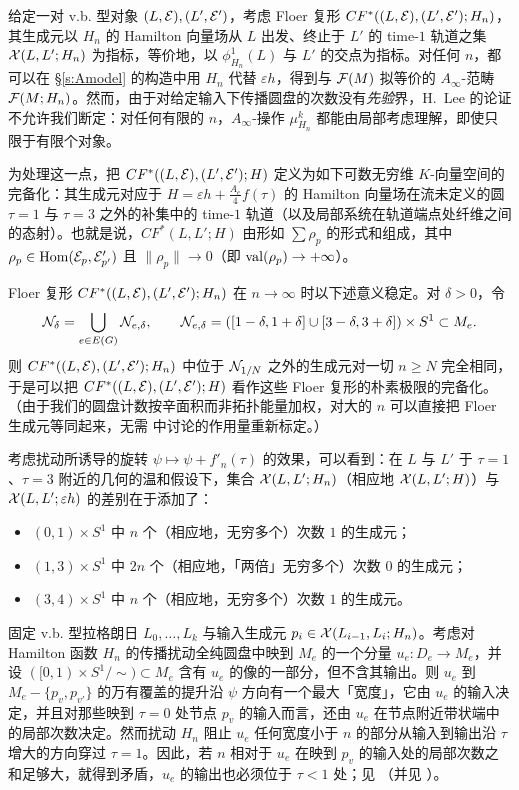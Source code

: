给定一对 v.b. 型对象 $(L,\mathcal{E}),(L',\mathcal{E}')$，考虑 Floer 复形 $CF^*((L,\mathcal{E}),(L',\mathcal{E}');H_n)$，其生成元以 $H_n$ 的 Hamilton 向量场从 $L$ 出发、终止于 $L'$ 的 time-$1$ 轨道之集 $\mathcal{X}(L,L';H_n)$ 为指标，等价地，以 $\phi^1_{H_n}(L)$ 与 $L'$ 的交点为指标。对任何 $n$，都可以在 §\ref{s:Amodel} 的构造中用 $H_n$ 代替 $\varepsilon h$，得到与 $\mathcal{F}(M)$ 拟等价的 $A_\infty$-范畴 $\mathcal{F}(M;H_n)$。然而，由于对给定输入下传播圆盘的次数没有\emph{先验}界，H.~Lee 的论证 \cite{Lee} 不允许我们断定：对任何有限的 $n$，$A_\infty$-操作 $\mu^k_{H_n}$ 都能由局部考虑理解，即使只限于有限个对象。

为处理这一点，把 $CF^*((L,\mathcal{E}),(L',\mathcal{E}');H)$ 定义为如下可数无穷维 $K$-向量空间的完备化：其生成元对应于 $H=\varepsilon h+\frac{A_e}{4}f(\tau)$ 的 Hamilton 向量场在流未定义的圆 $\tau=1$ 与 $\tau=3$ 之外的补集中的 time-$1$ 轨道（以及局部系统在轨道端点处纤维之间的态射）。也就是说，$CF^*(L,L';H)$ 由形如 $\sum \rho_p$ 的形式和组成，其中 $\rho_p\in\operatorname{Hom}(\mathcal{E}_{p},\mathcal{E}'_{p'})$ 且 $\|\rho_p\|\to 0$（即 $\operatorname{val}(\rho_p)\to+\infty$）。

Floer 复形 $CF^*((L,\mathcal{E}),(L',\mathcal{E}');H_n)$ 在 $n\to\infty$ 时以下述意义稳定。对 $\delta>0$，令
\[
\mathcal{N}_{\delta}=\bigcup_{e\in E(G)}\mathcal{N}_{e,\delta},\qquad
\mathcal{N}_{e,\delta}=([1-\delta,1+\delta]\cup[3-\delta,3+\delta])\times S^1\subset M_e .
\]
则 $CF^*((L,\mathcal{E}),(L',\mathcal{E}');H_n)$ 中位于 $\mathcal{N}_{1/N}$ 之外的生成元对一切 $n\geq N$ 完全相同，于是可以把 $CF^*((L,\mathcal{E}),(L',\mathcal{E}');H)$ 看作这些 Floer 复形的朴素极限的完备化。（由于我们的圆盘计数按辛面积而非拓扑能量加权，对大的 $n$ 可以直接把 Floer 生成元等同起来，无需 \cite{AuSm} 中讨论的作用量重新标定。）

考虑扰动所诱导的旋转 $\psi\mapsto\psi+f'_n(\tau)$ 的效果，可以看到：在 $L$ 与 $L'$ 于 $\tau=1$、$\tau=3$ 附近的几何的温和假设下，集合 $\mathcal{X}(L,L';H_n)$（相应地 $\mathcal{X}(L,L';H)$）与 $\mathcal{X}(L,L';\varepsilon h)$ 的差别在于添加了：
\begin{itemize}
\item $(0,1)\times S^1$ 中 $n$ 个（相应地，无穷多个）次数 $1$ 的生成元；
\item $(1,3)\times S^1$ 中 $2n$ 个（相应地，「两倍」无穷多个）次数 $0$ 的生成元；
\item $(3,4)\times S^1$ 中 $n$ 个（相应地，无穷多个）次数 $1$ 的生成元。
\end{itemize}

固定 v.b. 型拉格朗日 $L_0,\dots,L_k$ 与输入生成元 $p_i\in\mathcal{X}(L_{i-1},L_i;H_n)$。考虑对 Hamilton 函数 $H_n$ 的传播扰动全纯圆盘中映到 $M_e$ 的一个分量 $u_e:D_e\to M_e$，并设 $([0,1)\times S^1/\!\sim)\subset M_e$ 含有 $u_e$ 的像的一部分，但不含其输出。则 $u_e$ 到 $M_e-\{p_v,p_{v'}\}$ 的万有覆盖的提升沿 $\psi$ 方向有一个最大「宽度」，它由 $u_e$ 的输入决定，并且对那些映到 $\tau=0$ 处节点 $p_v$ 的输入而言，还由 $u_e$ 在节点附近带状端中的局部次数决定。然而扰动 $H_n$ 阻止 $u_e$ 任何宽度小于 $n$ 的部分从输入到输出沿 $\tau$ 增大的方向穿过 $\tau=1$。因此，若 $n$ 相对于 $u_e$ 在映到 $p_v$ 的输入处的局部次数之和足够大，就得到矛盾，$u_e$ 的输出也必须位于 $\tau<1$ 处；见 \cite[Lemma 3.5]{Lee}（并见 \cite[Proposition 5.5]{AuSm}）。

